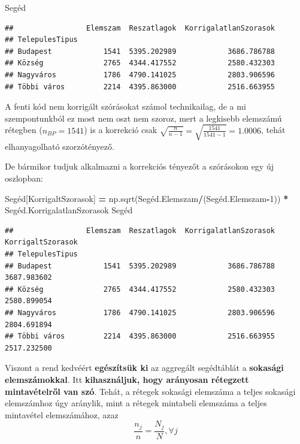 \documentclass[
]{book}
\newenvironment{Shaded}{\begin{snugshade}}{\end{snugshade}}
\newcommand{\DecValTok}[1]{\textcolor[rgb]{0.00,0.00,0.81}{#1}}
\newcommand{\NormalTok}[1]{#1}
\newcommand{\OperatorTok}[1]{\textcolor[rgb]{0.81,0.36,0.00}{\textbf{#1}}}
\newcommand{\StringTok}[1]{\textcolor[rgb]{0.31,0.60,0.02}{#1}}
\begin{document}
\begin{Shaded}
\begin{Highlighting}[]
\NormalTok{Segéd}
\end{Highlighting}
\end{Shaded}

\begin{verbatim}
##                 Elemszam  Reszatlagok  KorrigalatlanSzorasok
## TelepulesTipus                                              
## Budapest            1541  5395.202989            3686.786788
## Község              2765  4344.417552            2580.432303
## Nagyváros           1786  4790.141025            2803.906596
## Többi város         2214  4395.863000            2516.663955
\end{verbatim}

A fenti kód nem korrigált szórásokat számol technikailag, de a mi szempontunkból ez most nem oszt nem szoroz, mert a legkisebb elemszámú rétegben (\(n_{BP}=1541\)) is a korrekció csak \(\sqrt{\frac{n}{n-1}}=\sqrt{\frac{1541}{1541-1}}=1.0006\), tehát elhanyagolható szorzótényező.

De bármikor tudjuk alkalmazni a korrekciós tényezőt a szórásokon egy új oszlopban:

\begin{Shaded}
\begin{Highlighting}[]
\NormalTok{Segéd[}\StringTok{\textquotesingle{}KorrigaltSzorasok\textquotesingle{}}\NormalTok{] }\OperatorTok{=}\NormalTok{ np.sqrt(Segéd.Elemszam}\OperatorTok{/}\NormalTok{(Segéd.Elemszam}\OperatorTok{{-}}\DecValTok{1}\NormalTok{)) }\OperatorTok{*}\NormalTok{ Segéd.KorrigalatlanSzorasok}
\NormalTok{Segéd}
\end{Highlighting}
\end{Shaded}

\begin{verbatim}
##                 Elemszam  Reszatlagok  KorrigalatlanSzorasok  KorrigaltSzorasok
## TelepulesTipus                                                                 
## Budapest            1541  5395.202989            3686.786788        3687.983602
## Község              2765  4344.417552            2580.432303        2580.899054
## Nagyváros           1786  4790.141025            2803.906596        2804.691894
## Többi város         2214  4395.863000            2516.663955        2517.232500
\end{verbatim}

Viszont a rend kedvéért \textbf{egészítsük ki} az aggregált segédtáblát a \textbf{sokasági elemszámokkal}. Itt \textbf{kihasználjuk, hogy arányosan rétegzett mintavételről van szó}. Tehát, a rétegek sokasági elemszáma a teljes sokasági elemszámhoz úgy aránylik, mint a rétegek mintabeli elemszáma a teljes mintavétel elemszámához, azaz \[\frac{n_j}{n} = \frac{N_j}{N}, \forall j\]
\end{document}
